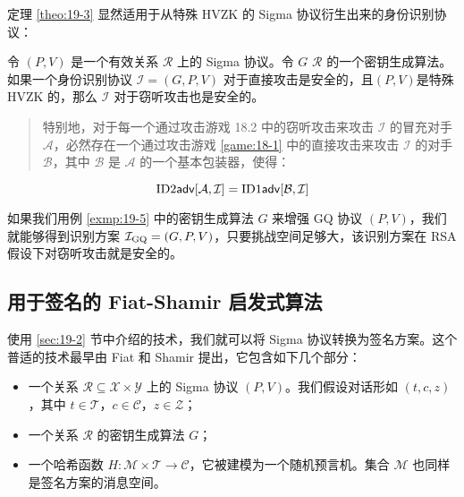 定理 \ref{theo:19-3} 显然适用于从特殊 HVZK 的 Sigma 协议衍生出来的身份识别协议：

\begin{theorem}\label{theo:19-15}
令 $(P,V)$ 是一个有效关系 $\mathcal{R}$ 上的 Sigma 协议。令 $G$ $\mathcal{R}$ 的一个密钥生成算法。如果一个身份识别协议 $\mathcal{I}=(G,P,V)$ 对于直接攻击是安全的，且$(P,V)$是特殊 HVZK 的，那么 $\mathcal{I}$ 对于窃听攻击也是安全的。
\begin{quote}
特别地，对于每一个通过攻击游戏 18.2 中的窃听攻击来攻击 $\mathcal{I}$ 的冒充对手 $\mathcal{A}$，必然存在一个通过攻击游戏 \ref{game:18-1} 中的直接攻击来攻击 $\mathcal{I}$ 的对手 $\mathcal{B}$，其中 $\mathcal{B}$ 是 $\mathcal{A}$ 的一个基本包装器，使得：
\end{quote}
\[
{\rm ID2\mathsf{adv}}[\mathcal{A},\mathcal{I}]=
{\rm ID1\mathsf{adv}}[\mathcal{B},\mathcal{I}]
\]
\end{theorem}

\begin{example}\label{exmp:19-6}
如果我们用例 \ref{exmp:19-5} 中的密钥生成算法 $G$ 来增强 GQ 协议 $(P,V)$，我们就能够得到识别方案 $\mathcal{I}_{\rm GQ}=(G,P,V)$，只要挑战空间足够大，该识别方案在 RSA 假设下对窃听攻击就是安全的。
\end{example}

\subsection{用于签名的 Fiat-Shamir 启发式算法}\label{subsec:19-6-1}

使用 \ref{sec:19-2} 节中介绍的技术，我们就可以将 Sigma 协议转换为签名方案。这个普适的技术最早由 Fiat 和 Shamir 提出，它包含如下几个部分：
\begin{itemize}
	\item 一个关系 $\mathcal{R}\subseteq\mathcal{X}×\mathcal{Y}$ 上的 Sigma 协议 $(P,V)$。我们假设对话形如 $(t,c,z)$，其中 $t\in\mathcal{T}$，$c\in\mathcal{C}$，$z\in\mathcal{Z}$；
	\item 一个关系 $\mathcal{R}$ 的密钥生成算法 $G$；
	\item 一个哈希函数 $H:\mathcal{M}\times\mathcal{T}\to\mathcal{C}$，它被建模为一个随机预言机。集合 $\mathcal{M}$ 也同样是签名方案的消息空间。
\end{itemize}

